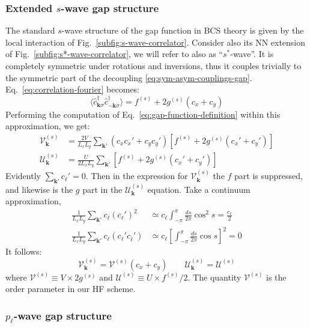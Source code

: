 \subsubsection*{Extended $s$-wave gap structure}\label{subsubsec:swave-gap-structure}

The standard $s$-wave structure of the gap function in BCS theory is given by the local interaction of Fig.~\ref{subfig:s-wave-correlator}. Consider also its NN extension of Fig.~\ref{subfig:s*-wave-correlator}, we will refer to also as ``$s^*$-wave''. It is completely symmetric under rotations and inversions, thus it couples trivially to the symmetric part of the decoupling \eqref{eq:sym-asym-couplings-gap}. Eq.~\eqref{eq:correlation-fourier} becomes:
\[
	\langle 
	\hat c_{\mathbf{k}\sigma}^\dagger \hat c_{-\mathbf{k} \overline{\sigma}}^\dagger
	\rangle = f^{(s)} + 2g^{(s)} (c_x + c_y)
\]
Performing the computation of Eq.~\eqref{eq:gap-function-definition} within this approximation, we get:
\[
\begin{aligned}
	\mathcal{V}_\mathbf{k}^{(s)} &= \frac{2V}{L_x L_y} \sum_{\mathbf{k}'} (c_x c_x' + c_y c_y') \left[
		f^{(s)} + 2g^{(s)}(c_x' + c_y')
	\right] \\
	\mathcal{U}_\mathbf{k}^{(s)} &= \frac{U}{2L_x L_y} \sum_{\mathbf{k}'} \left[
		f^{(s)} + 2g^{(s)}(c_x' + c_y')
	\right]
\end{aligned}
\]
Evidently $\sum_{\mathbf{k}'} c_\ell' = 0$. Then in the expression for $\mathcal{V}_\mathbf{k}^{(s)}$ the $f$ part is suppressed, and likewise is the $g$ part in the $\mathcal{U}_\mathbf{k}^{(s)}$ equation. Take a continuum approximation,
\[
\begin{aligned}
	\frac{1}{L_x L _y}\sum_{\mathbf{k}'} c_\ell (c_\ell')^2 &\simeq c_\ell \int_{-\pi}^\pi \frac{ds}{2\pi} \cos^2 s = \frac{c_\ell}{2} \\
	\frac{1}{L_x L _y}\sum_{\mathbf{k}'} c_\ell (c_\ell' c_{\overline{\ell}}') &\simeq c_\ell \left[ \int_{-\pi}^\pi \frac{ds}{2\pi} \cos s \right]^2 = 0
\end{aligned}
\]
It follows:
\begin{equation}\label{eq:swave-gap}
	\mathcal{V}_\mathbf{k}^{(s)} = \mathcal{V}^{(s)} (c_x + c_y)
	\qquad
	\mathcal{U}_\mathbf{k}^{(s)} = \mathcal{U}^{(s)}
\end{equation}
where $\mathcal{V}^{(s)} \equiv V \times 2g^{(s)}$ and $\mathcal{U}^{(s)} \equiv U \times f^{(s)}/2$. The quantity $\mathcal{V}^{(s)}$ is the order parameter in our HF scheme.

\subsubsection{$p_\ell$-wave gap structure}

